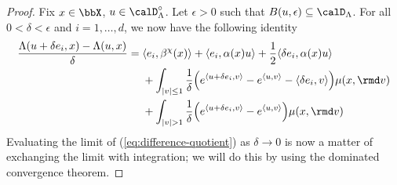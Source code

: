 \begin{proof}
  \label{proof:lemma:ode-differentiable}
  Fix $\stateVar \in \stateSpace$, $\momentVar \in \odeSpace^\circ$.
  Let $\epsilon > 0$ such that $B(\momentVar, \epsilon) \subseteq \odeSpace$.
  For all $0 < \delta < \epsilon$ and $i = 1, \ldots, d$, we now have the following identity
  \begin{equation}
    \label{eq:difference-quotient}
    \frac{\ode(\momentVar+\delta \basisVec_i,\stateVar) - \ode(\momentVar,\stateVar)}{\delta}
    = \begin{aligned}[t]
      &\prj{\basisVec_i}{\affDrift^\trunc(\stateVar)} + \prj{\basisVec_i}{\affDiff(\stateVar)\momentVar} + \frac12\prj{\delta \basisVec_i}{\affDiff(\stateVar)\momentVar} \\
      &+ \int_{|\markVar|\leq 1} \frac1\delta\Big( e^\prj{\momentVar+\delta \basisVec_i}{\markVar} - e^\prj{\momentVar}{\markVar} - \prj{\delta \basisVec_i}{\markVar} \Big) \affJump(\stateVar,\rmd\markVar) \\
      &+ \int_{|\markVar| > 1}  \frac1\delta\Big( e^\prj{\momentVar+\delta \basisVec_i}{\markVar} - e^\prj{\momentVar}{\markVar} \Big) \affJump(\stateVar,\rmd\markVar) \\
    \end{aligned}
  \end{equation}
  Evaluating the limit of (\ref{eq:difference-quotient}) as $\delta \rightarrow 0$ is now a matter of exchanging the limit with integration; we will do this by using the dominated convergence theorem.


\end{proof}
